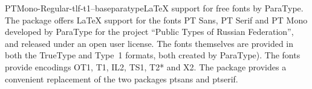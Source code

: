\documentclass{ddltxtyp}
\begin{document}
\begin{package}{PTMono-Regular-tlf-t1--base}{paratype}{{\LaTeX} support for free fonts by ParaType.}
The package offers {\LaTeX} support for the fonts PT Sans, PT
Serif and PT Mono developed by ParaType for the project ``Public
Types of Russian Federation'', and released under an open user
license. The fonts themselves are provided in both the TrueType
and Type~1 formats, both created by ParaType). The fonts
provide encodings OT1, T1, IL2, TS1, T2* and X2. The package
provides a convenient replacement of the two packages ptsans
and ptserif.
\end{package}
\end{document}
